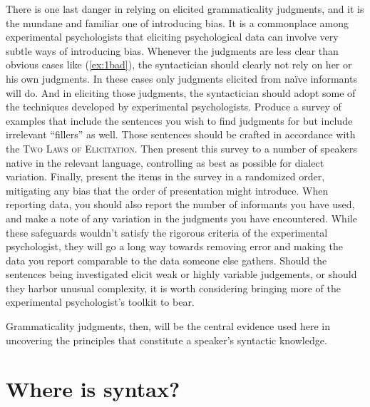 {There is one last danger in relying on elicited grammaticality judgments, and it is the mundane and familiar one of introducing bias. It is a commonplace among experimental psychologists that eliciting psychological data can involve very subtle ways of introducing bias. Whenever the judgments are less clear than obvious cases like (\ref{ex:1bad}), the syntactician should clearly not rely on her or his own judgments. In these cases only judgments elicited from na\"ive informants will do. And in eliciting those judgments, the syntactician should adopt some of the techniques developed by experimental psychologists. Produce a survey of examples that include the sentences you wish to find judgments for but include irrelevant ``fillers'' as well. Those sentences should be crafted in accordance with the \textsc{Two Laws of Elicitation}. Then present this survey to a number of speakers native in the relevant language, controlling as best as possible for dialect variation. Finally, present the items in the survey in a randomized order, mitigating any bias that the order of presentation might introduce. When reporting data, you should also report the number of informants you have used, and make a note of any variation in the judgments you have encountered. While these safeguards wouldn't satisfy the rigorous criteria of the experimental psychologist, they will go a long way towards removing error and making the data you report comparable to the data someone else gathers. Should the sentences being investigated elicit weak or highly variable judgements, or should they harbor unusual complexity, it is worth considering bringing more of the experimental psychologist's toolkit to bear.

Grammaticality judgments, then, will be the central evidence used here in uncovering the principles that constitute a speaker's syntactic knowledge. 

\section{Where is syntax?} %
\label{sec:what}

}
